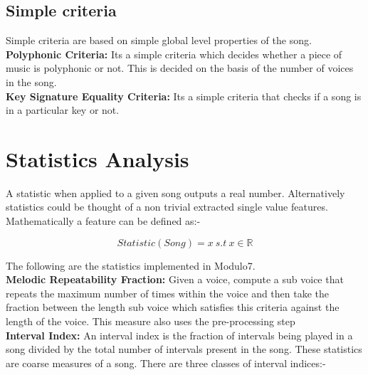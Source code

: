 \subsection{Simple criteria} 

\noindent Simple criteria are based on simple global level properties of the song. \\

\noindent \textbf{Polyphonic Criteria:} Its a simple criteria which decides whether a piece of music is polyphonic or not. This is decided on the basis of the number of voices in the song. \\

\noindent \textbf{Key Signature Equality Criteria:} Its a simple criteria that checks if a song is in a particular key or not.

\section{Statistics Analysis} \label{statistic}

\noindent A statistic when applied to a given song outputs a real number. Alternatively statistics could be thought of a non trivial extracted single value features. Mathematically a feature can be defined as:-

\begin{equation}
Statistic(Song) = x \ s.t \ x \in \mathbb{R}
\end{equation}

\noindent The following are the statistics implemented in Modulo7. \\

\noindent \textbf{Melodic Repeatability Fraction: } Given a voice, compute a sub voice that repeats the maximum number of times within the voice and then take the fraction between the length sub voice which satisfies this criteria against the length of the voice. This measure also uses the pre-processing step \\

\noindent \textbf{Interval Index: } \label{intervals} An interval index is the fraction of intervals being played in a song divided by the total number of intervals present in the song. These statistics are coarse measures of a song. There are three classes of interval indices:-

